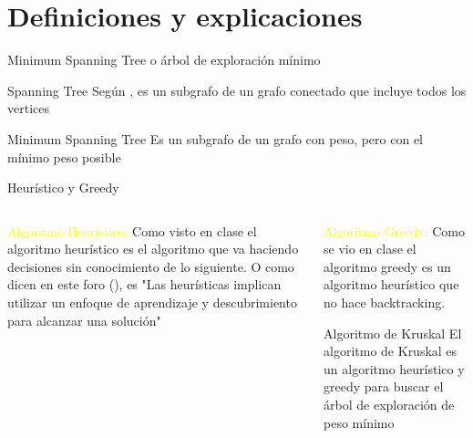 \section{Definiciones y explicaciones}
\frame{\sectionpage}

\begin{frame}{Minimum Spanning Tree o árbol de exploración mínimo}
    \begin{block}{Spanning Tree} %
        Según \cite{Goodaire_Parmenter_2001}, es un subgrafo de un grafo conectado que incluye todos los vertices
    \end{block}
    \begin{exampleblock}{Minimum Spanning Tree} %
        Es un subgrafo de un grafo con peso, pero con el mínimo peso posible
    \end{exampleblock}

\end{frame}

\begin{frame}{Heurístico y Greedy}
    \begin{columns}
        \begin{column}{0.5\textwidth}
            \textcolor{yellow}{Algoritmo Heurístico:} Como visto en clase el algoritmo heurístico es el algoritmo que va haciendo decisiones sin conocimiento de lo siguiente. O como dicen en este foro (\cite{heuri}), es "Las heurísticas implican utilizar un enfoque de aprendizaje y descubrimiento para alcanzar una solución"
        \end{column}
        \begin{column}{0.5\textwidth}
            \textcolor{yellow}{Algoritmo Greedy:} Como se vio en clase el algoritmo greedy es un algoritmo heurístico que no hace backtracking.
            \begin{block}{Algoritmo de Kruskal}
                El algoritmo de Kruskal es un algoritmo heurístico y greedy para buscar el árbol de exploración de peso mínimo
            \end{block}
        \end{column}
    \end{columns}
\end{frame}
